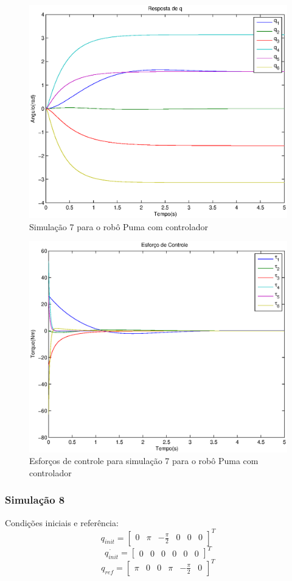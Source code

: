 \documentclass{article}
\begin{document}
\begin{figure}[H]
	\centering
	\includegraphics[width=0.8\linewidth]{../sim1cl}
	\caption{Simulação 7 para o robô Puma com controlador}
	\label{fig:pumasim7}
\end{figure}

\begin{figure}[H]
	\centering
	\includegraphics[width=0.8\linewidth]{../sim1clu}
	\caption{Esforços de controle para simulação 7 para o robô Puma com controlador}
	\label{fig:pumasim7clu}
\end{figure}

\subsubsection{Simulação 8}
Condições iniciais e referência:
\begin{equation}
\label{eq:sim8q}
q_{init}=\begin{bmatrix}
0 & \pi & -\frac{\pi}{2} & 0 & 0 & 0
\end{bmatrix}^T
\end{equation}
\begin{equation}
\label{eq:sim8qd}
\dot{q_{init}}=\begin{bmatrix}
0 & 0 & 0 & 0 & 0 & 0
\end{bmatrix}^T
\end{equation}
\begin{equation}
\label{eq:sim8qr}
q_{ref}=\begin{bmatrix}
\pi & 0 & 0 & \pi & -\frac{\pi}{2} & 0
\end{bmatrix}^T
\end{equation}
\end{document}

